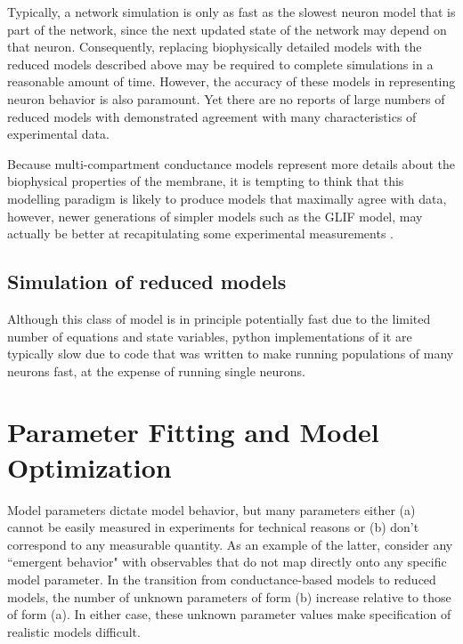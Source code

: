 Typically, a network simulation is only as fast as the slowest neuron model that is part of the network, since the next updated state of the network may depend on that neuron.
Consequently, replacing biophysically detailed models with the reduced models described above may be required to complete simulations in a reasonable amount of time.
However, the accuracy of these models in representing neuron behavior is also paramount.
Yet there are no reports of large numbers of reduced models with demonstrated agreement with many characteristics of experimental data.

Because multi-compartment conductance models represent more details about the biophysical properties of the membrane, it is tempting to think that this modelling paradigm is likely to produce models that maximally agree with data, however, newer generations of simpler models such as the GLIF model, may actually be better at recapitulating some experimental measurements \citep{meunier2002playing}.


\subsection{Simulation of reduced models}
Although this class of model is in principle potentially fast due to the limited number of equations and state variables, python implementations of it are typically slow due to code that was written to make running populations of many neurons fast, at the expense of running single neurons. 
\\
\section{Parameter Fitting and Model Optimization}
Model parameters dictate model behavior, but many parameters either (a) cannot be easily measured in experiments for technical reasons or (b) don't correspond to any measurable quantity.
As an example of the latter, consider any ``emergent behavior" with observables that do not map directly onto any specific model parameter.
In the transition from conductance-based models to reduced models, the number of unknown parameters of form (b) increase relative to those of form (a).
In either case, these unknown parameter values make specification of realistic models difficult.

